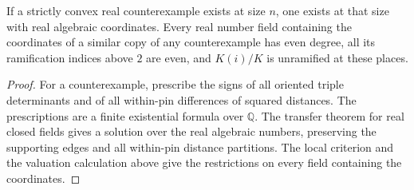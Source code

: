 \begin{corollary}[982-D05, 982-D06]
If a strictly convex real counterexample exists at size \(n\), one exists at that size with real algebraic coordinates. Every real number field containing the coordinates of a similar copy of any counterexample has even degree, all its ramification indices above \(2\) are even, and \(K(i)/K\) is unramified at these places.
\end{corollary}

\begin{proof}
For a counterexample, prescribe the signs of all oriented triple determinants and of all within-pin differences of squared distances. The prescriptions are a finite existential formula over \(\mathbb Q\). The transfer theorem for real closed fields gives a solution over the real algebraic numbers, preserving the supporting edges and all within-pin distance partitions. The local criterion and the valuation calculation above give the restrictions on every field containing the coordinates.
\end{proof}
